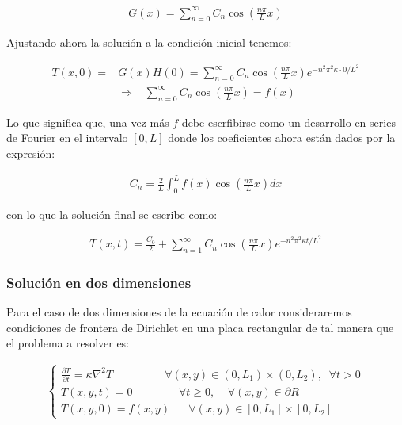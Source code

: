 \documentclass[12pt]{article}
\begin{document}
\begin{align*}
    G(x) = \sum_{n=0}^{\infty} C_n\cos\left(\frac{n\pi}{L}x\right)
\end{align*}

Ajustando ahora la solución a la condición inicial tenemos:

\begin{align*}
    T(x,0) = &G(x)H(0) = \sum_{n=0}^{\infty} C_n\cos\left(\frac{n\pi}{L}x\right) e^{-n^2\pi^2\kappa \cdot 0/L^2} \\
    &\Rightarrow \;\;\; \sum_{n=0}^{\infty} C_n\cos\left(\frac{n\pi}{L}x\right) = f(x)
\end{align*}

Lo que significa que, una vez más $f$ debe escrfibirse como un desarrollo en series de Fourier en el intervalo $[0,L]$ donde los coeficientes ahora están dados por la expresión:

\begin{align*}
    C_n = \frac{2}{L}\int_{0}^{L}f(x)\cos\left(\frac{n\pi}{L}x\right)dx
\end{align*}

con lo que la solución final se escribe como:

\begin{align}
    T(x,t) = \frac{C_0}{2} + \sum_{n=1}^{\infty} C_n\cos\left(\frac{n\pi}{L}x\right) e^{-n^2\pi^2\kappa t/L^2}
\end{align}

\subsubsection{Solución en dos dimensiones}

Para el caso de dos dimensiones de la ecuación de calor consideraremos condiciones de frontera de Dirichlet en una placa rectangular de tal manera que el problema a resolver es:

\begin{align}
    \begin{cases}
        \frac{\partial T}{\partial t} = \kappa \nabla^2T \;\;\;\;\;\;\;\;\;\;\;\;\;\;\;\;\; \forall (x,y)\in (0,L_1)\times(0,L_2), \;\; \forall t>0 \\
        T(x,y,t) = 0 \;\;\;\;\;\;\;\;\;\;\;\;\;\;\; \forall t \geq 0, \;\;\;\; \forall(x,y) \in \partial R \\
        T(x,y,0) = f(x,y) \;\;\;\;\;\; \forall (x,y)\in [0,L_1]\times[0,L_2]
    \end{cases}
\end{align}
\end{document}
